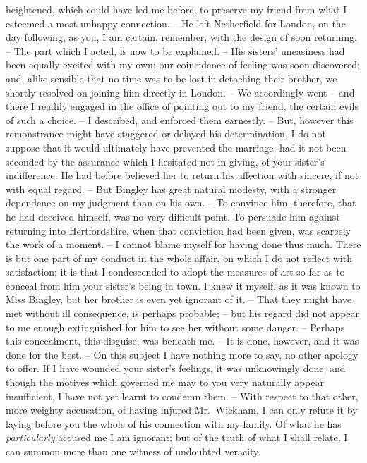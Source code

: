 \begin{letter}
heightened, which could have led me before, to
preserve my friend from what I esteemed a most unhappy
connection. -- He left Netherfield for London, on the day
following, as you, I am certain, remember, with the design
of soon returning. -- The part which I acted, is now to be
explained. -- His sisters’ uneasiness had been equally
excited with my own; our coincidence of feeling was soon
discovered; and, alike sensible that no time was to be
lost in detaching their brother, we shortly resolved on
joining him directly in London. -- We accordingly went -- and
there I readily engaged in the office of pointing out
to my friend, the certain evils of such a choice. -- I described,
and enforced them earnestly. -- But, however this
remonstrance might have staggered or delayed his determination,
I do not suppose that it would ultimately have
prevented the marriage, had it not been seconded by the
assurance which I hesitated not in giving, of your sister’s
indifference. He had before believed her to return his
affection with sincere, if not with equal regard. -- But
Bingley has great natural modesty, with a stronger dependence
on my judgment than on his own. -- To convince
him, therefore, that he had deceived himself, was no very
difficult point. To persuade him against returning into
Hertfordshire, when that conviction had been given, was
scarcely the work of a moment. -- I cannot blame myself
for having done thus much. There is but one part of my
conduct in the whole affair, on which I do not reflect
with satisfaction; it is that I condescended to adopt the
measures of art so far as to conceal from him your sister’s
being in town. I knew it myself, as it was known to
Miss Bingley, but her brother is even yet ignorant of it. --
That they might have met without ill consequence, is
perhaps probable; -- but his regard did not appear to me
enough extinguished for him to see her without some
danger. -- Perhaps this concealment, this disguise, was
beneath me. -- It is done, however, and it was done for
the best. -- On this subject I have nothing more to say,
no other apology to offer. If I have wounded your sister’s
feelings, it was unknowingly done; and though the
motives which governed me may to you very naturally
appear insufficient, I have not yet learnt to condemn
them. -- With respect to that other, more weighty accusation,
of having injured Mr.\ Wickham, I can only refute
it by laying before you the whole of his connection with
my family. Of what he has \textit{particularly} accused me I am
ignorant; but of the truth of what I shall relate, I can
summon more than one witness of undoubted veracity.

\end{letter}
